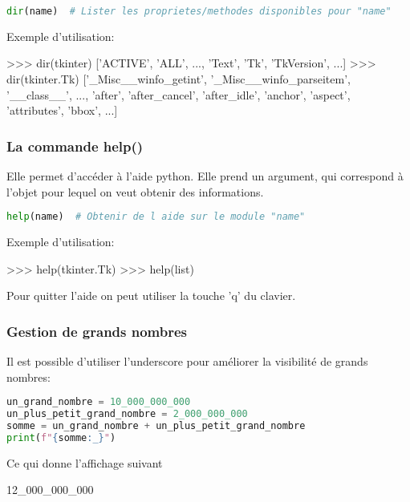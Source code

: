 \begin{lstlisting}[language=Python]
dir(name)  # Lister les proprietes/methodes disponibles pour "name"
\end{lstlisting}

Exemple d'utilisation:

\begin{terminal}
>>> dir(tkinter)
['ACTIVE', 'ALL', ...,  'Text', 'Tk', 'TkVersion', ...]
>>> dir(tkinter.Tk)
['_Misc__winfo_getint', '_Misc__winfo_parseitem', '__class__', ..., 'after', 'after_cancel', 'after_idle', 'anchor', 'aspect', 'attributes', 'bbox', ...]
\end{terminal}

\subsubsection{La commande help()}

Elle permet d'accéder à l'aide python. Elle prend un argument, qui correspond à l'objet pour lequel on veut obtenir des informations.
\begin{lstlisting}[language=Python]
help(name)  # Obtenir de l aide sur le module "name"
\end{lstlisting}

Exemple d'utilisation:

\begin{terminal}
>>> help(tkinter.Tk)
>>> help(list)
\end{terminal}

Pour quitter l'aide on peut utiliser la touche 'q' du clavier.

\subsubsection{Gestion de grands nombres}

Il est possible d'utiliser l'underscore pour améliorer la visibilité de grands nombres:
\begin{lstlisting}[language=Python]
un_grand_nombre = 10_000_000_000
un_plus_petit_grand_nombre = 2_000_000_000
somme = un_grand_nombre + un_plus_petit_grand_nombre
print(f"{somme:_}")
\end{lstlisting}
Ce qui donne l'affichage suivant
\begin{terminal}
12_000_000_000
\end{terminal}

